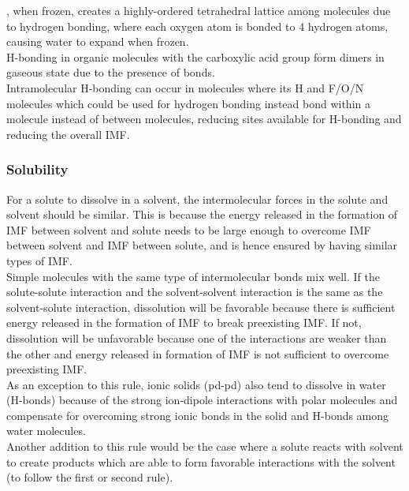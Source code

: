 \documentclass[../main]{subfiles}
\begin{document}
	, when frozen, creates a highly-ordered tetrahedral lattice among molecules due to hydrogen bonding, where each oxygen atom is bonded to 4 hydrogen atoms, causing water to expand when frozen. \\

	H-bonding in organic molecules with the carboxylic acid group  form dimers in gaseous state due to the presence of  bonds. \\

	Intramolecular H-bonding can occur in molecules where its H and F/O/N molecules which could be used for hydrogen bonding instead bond within a molecule instead of between molecules, reducing sites available for H-bonding and reducing the overall IMF.

	\subsubsection{Solubility}

	For a solute to dissolve in a solvent, the intermolecular forces in the solute and solvent should be similar. This is because the energy released in the formation of IMF between solvent and solute needs to be large enough to overcome IMF between solvent and IMF between solute, and is hence ensured by having similar types of IMF. \\

	Simple molecules with the same type of intermolecular bonds mix well. If the solute-solute interaction and the solvent-solvent interaction is the same as the solvent-solute interaction, dissolution will be favorable because there is sufficient energy released in the formation of IMF to break preexisting IMF. If not, dissolution will be unfavorable because one of the interactions are weaker than the other and energy released in formation of IMF is not sufficient to overcome preexisting IMF. \\

	As an exception to this rule, ionic solids (pd-pd) also tend to dissolve in water (H-bonds) because of the strong ion-dipole interactions with polar molecules and compensate for overcoming strong ionic bonds in the solid and H-bonds among water molecules. \\

	Another addition to this rule would be the case where a solute reacts with solvent to create products which are able to form favorable interactions with the solvent (to follow the first or second rule).
\end{document}

